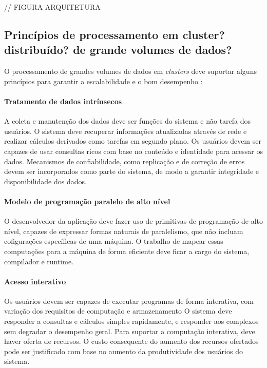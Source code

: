 // FIGURA ARQUITETURA

\subsection{ Princípios de processamento em cluster? distribuído? de grande volumes de dados? }

O processamento de grandes volumes de dados em \textit{clusters} deve suportar alguns princípios para garantir a escalabilidade e o bom desempenho \cite{Bryant:2011}:



\paragraph{Tratamento de dados intrínsecos}
A coleta e manutenção dos dados deve ser funções do sistema e não tarefa dos usuários.  
O sistema deve recuperar informações atualizadas através de rede e realizar cálculos derivados como tarefas em segundo plano. Os usuários devem ser capazes de usar consultas ricos com base no conteúdo e identidade para acessar os dados. 
Mecanismos de confiabilidade, como replicação e de correção de erros devem ser incorporados como parte do sistema, de modo a garantir integridade e disponibilidade dos dados.

\paragraph{Modelo de programação paralelo de alto nível}
O desenvolvedor da aplicação deve fazer uso de primitivas de programação de alto nível, capazes de expressar formas naturais de paralelismo, que não incluam cofigurações específicas de uma máquina. O trabalho de mapear essas computações para a máquina de forma eficiente deve ficar a cargo do sistema, compilador e runtime.

\paragraph{Acesso interativo} 
Os usuários devem ser capazes de executar programas de forma interativa, com variação dos requisitos de computação e armazenamento O sistema deve responder a consultas e cálculos simples rapidamente, e responder aos complexos sem degradar o desempenho geral. Para suportar a computação interativa, deve haver oferta de recursos. O custo consequente do aumento dos recursos ofertados pode ser justificado com base no aumento da produtividade dos usuários do sistema.


